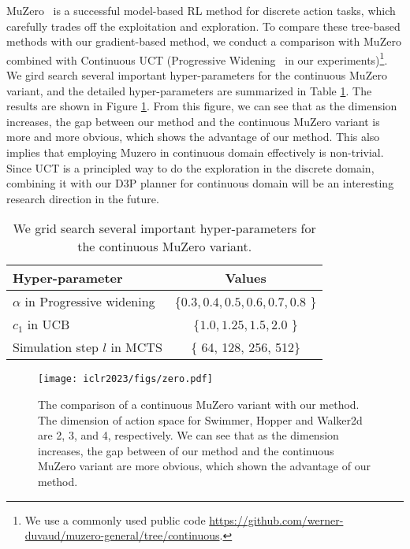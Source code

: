 \documentclass{article} %
\newcommand{\revision}[1]{{#1}}
\begin{document}
\revision{MuZero~\citep{schrittwieser2020mastering} is a successful model-based RL method for discrete action tasks, which carefully trades off the exploitation and exploration. To compare these tree-based methods with our gradient-based method, we conduct a comparison with MuZero combined with Continuous UCT (Progressive Widening~\citep{couetoux2011continuous} in our experiments)\footnote{We use a commonly used public code \url{https://github.com/werner-duvaud/muzero-general/tree/continuous}.}. We gird search several important hyper-parameters for the continuous MuZero variant, and the detailed hyper-parameters are summarized in  Table \ref{tab:muzero}. The results are shown in Figure \ref{fig:zero}. From this figure, we can see that as the dimension increases, the gap between   our method and the continuous MuZero variant is more and more obvious, which shows the advantage of our method. This also implies that employing  Muzero in continuous domain effectively is non-trivial. 
Since UCT is a principled way to do the exploration in the discrete domain, combining it with our D3P planner for continuous domain will be an interesting research direction in the future. }
\begin{table}[!htb]
    \centering
    \begin{tabular}{lc}
    \toprule
         Hyper-parameter& Values  \\
         \midrule
         $\alpha$ in Progressive widening & \{$0.3, 0.4, 0.5, 0.6, 0.7, 0.8$ \} \\
         $c_1$ in UCB & \{$1.0, 1.25, 1.5, 2.0$ \}\\
         Simulation step $l$  in MCTS & \{ 64, 128, 256, 512\} \\
         \bottomrule
    \end{tabular}
    \caption{We grid search several important hyper-parameters for the continuous MuZero variant.}
    \label{tab:muzero}
\end{table}
\begin{figure}[!htb]
    \centering
    \texttt{[image: iclr2023/figs/zero.pdf]}
    \caption{The comparison of a continuous MuZero variant with our method. The dimension of action space for Swimmer, Hopper and Walker2d are 2, 3, and 4, respectively. We can see that as the dimension increases, the gap between of our method and the continuous MuZero variant are more obvious, which shown the advantage of our method.}
    \label{fig:zero}
\end{figure}
\end{document}
